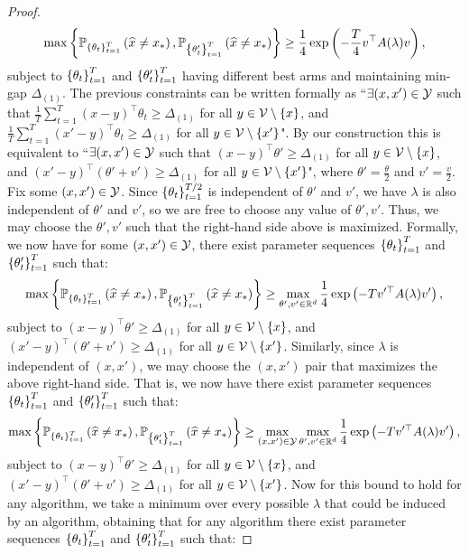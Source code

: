 \begin{proof}
\begin{equation}\max\left\{\mathbb{P}_{\left\{\theta_t\right\}_{t=1}^{T}}\left(\widehat{x}\neq x_*\right), \mathbb{P}_{\left\{\theta'_t\right\}_{t=1}^{T}}\left(\widehat{x}\neq x_*\right)\right\} \geq \frac{1}{4} \exp \left(- \frac{T}{4}v^\top A(\lambda)v \right),\end{equation}
subject to $\left\{\theta_t\right\}_{t=1}^{T}$ and $\left\{\theta'_t\right\}_{t=1}^{T}$ having different best arms and maintaining min-gap $\Delta_{(1)}$. The previous constraints can be written formally as ``$\exists (x,x') \in \mathcal{Y}$ such that $\frac{1}{T}\sum_{t=1}^{T}(x - y)^\top\theta_t \geq \Delta_{(1)}$ for all $y \in \mathcal{V} \setminus \{x\}$, and $ \frac{1}{T}\sum_{t=1}^{T}(x' - y)^\top\theta_t \geq \Delta_{(1)}$ for all $y \in \mathcal{V} \setminus \{x'\}$". By our construction this is equivalent to ``$\exists (x,x') \in \mathcal{Y}$ such that $(x-y)^\top\theta' \geq \Delta_{(1)}$ for all $y \in \mathcal{V} \setminus \{x\}$, and $ (x'-y)^\top(\theta' + v') \geq \Delta_{(1)}$ for all $y \in \mathcal{V} \setminus \{x'\}$", where $\theta' = \frac{\theta}{2}$ and $v' = \frac{v}{2}$. Fix some $(x,x') \in \mathcal{Y}$. Since $\left\{\theta_t\right\}_{t=1}^{T/2}$ is independent of $\theta'$ and $v'$, we have $\lambda$ is also independent of $\theta'$ and $v'$, so we are free to choose any value of $\theta',v'$. Thus, we may choose the $\theta',v'$ such that the right-hand side above is maximized. Formally, we now have for some $(x,x') \in \mathcal{Y}$, there exist parameter sequences $\left\{\theta_t\right\}_{t=1}^{T}$ and $\left\{\theta'_t\right\}_{t=1}^{T}$ such that: 
\begin{equation}\max\left\{\mathbb{P}_{\left\{\theta_t\right\}_{t=1}^{T}}\left(\widehat{x}\neq x_*\right), \mathbb{P}_{\left\{\theta'_t\right\}_{t=1}^{T}}\left(\widehat{x}\neq x_*\right)\right\} \geq \max_{\theta',v' \in \mathbb{R}^d}\frac{1}{4} \exp \left(- Tv'^\top A(\lambda)v' \right),\end{equation}
subject to $(x - y)^\top\theta' \geq \Delta_{(1)}$ for all $y \in \mathcal{V} \setminus \{x\}$, and $ (x' - y)^\top(\theta' + v') \geq \Delta_{(1)}$ for all $y \in \mathcal{V} \setminus \{x'\}$. Similarly, since $\lambda$ is independent of $(x,x')$, we may choose the $(x,x')$ pair that maximizes the above right-hand side. That is, we now have there exist parameter sequences $\left\{\theta_t\right\}_{t=1}^{T}$ and $\left\{\theta'_t\right\}_{t=1}^{T}$ such that: 
\begin{equation}\max\left\{\mathbb{P}_{\left\{\theta_t\right\}_{t=1}^{T}}\left(\widehat{x}\neq x_*\right), \mathbb{P}_{\left\{\theta'_t\right\}_{t=1}^{T}}\left(\widehat{x}\neq x_*\right)\right\} \geq \max_{(x,x') \in \mathcal{Y}}\max_{\theta',v' \in \mathbb{R}^d}\frac{1}{4} \exp \left(-  Tv'^\top A(\lambda)v' \right),\end{equation}
subject to $(x - y)^\top\theta' \geq \Delta_{(1)}$ for all $y \in \mathcal{V} \setminus \{x\}$, and $ (x' - y)^\top(\theta' + v') \geq \Delta_{(1)}$ for all $y \in \mathcal{V} \setminus \{x'\}$. Now for this bound to hold for any algorithm, we take a minimum over every possible $\lambda$ that could be induced by an algorithm, obtaining that for any algorithm there exist parameter sequences $\left\{\theta_t\right\}_{t=1}^{T}$ and $\left\{\theta'_t\right\}_{t=1}^{T}$  such that: 

\end{proof}
